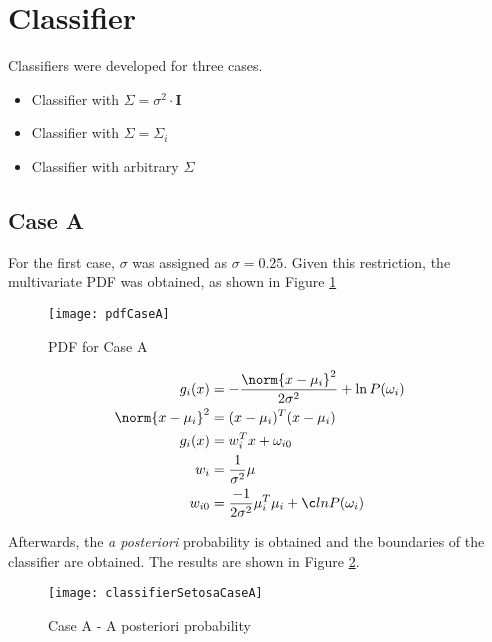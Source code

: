 \pagebreak
\newpage

\pagebreak
\newpage

\section{Classifier}

Classifiers were developed for three cases.

\begin{itemize}
 \item Classifier with $\Sigma = \sigma^2 \cdot \mathbf{I}$
 \item Classifier with $\Sigma = \Sigma_i$
 \item Classifier with arbitrary $\Sigma$
\end{itemize}


\subsection{Case A}
For the first case, $\sigma$ was assigned as $\sigma = 0.25$.
Given this restriction, the multivariate PDF was obtained, as shown in Figure \ref{fig: case a PDF}

\begin{figure}[htb!]
\centering
 \texttt{[image: pdfCaseA]}
 \caption{PDF for Case A}
 \label{fig: case a PDF}
\end{figure}

\begin{align*}
 g_i(x) &= - \frac{\norm{x-\mu_i}^2}{2\sigma^2} + \ln P(\omega_i)\\
 \norm{x-\mu_i}^2 &= (x-\mu_i)^T (x-\mu_i)\\
 g_i(x) &= w^T_i x + \omega_{i0}\\
 w_i &= \frac{1}{\sigma^2} \mu\\
 w_{i0} &= \frac{-1}{2 \sigma^2} \mu^T_i \mu_i + ļn P(\omega_i)
\end{align*}


\pagebreak
\newpage


Afterwards, the \emph{a posteriori} probability is obtained and the boundaries of the classifier are obtained.
The results are shown in Figure \ref{fig: posteriori case A}.

\begin{figure}[htb!]
\centering
 \texttt{[image: classifierSetosaCaseA]}
 \caption{Case A - A posteriori probability}
 \label{fig: posteriori case A}
\end{figure}




